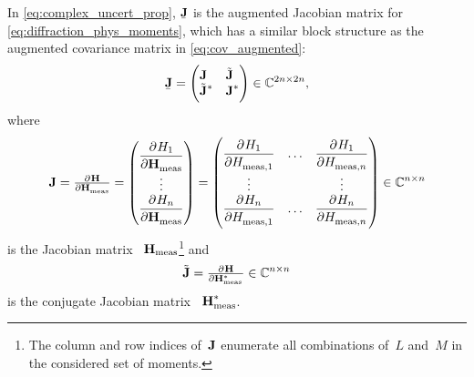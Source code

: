 In \cref{eq:complex_uncert_prop}, $\underaccent{\bar}{\mat{J}}$ is the
augmented Jacobian matrix for \cref{eq:diffraction_phys_moments}, which
has a similar block structure as the augmented covariance matrix in
\cref{eq:cov_augmented}:
\begin{equation}
  \label{eq:J_augmented}
  \underaccent{\bar}{\mat{J}}
  = \begin{pmatrix*}[l]
    \mat{J} & \tilde{\mat{J}} \\
    \tilde{\mat{J}}^* & \mat{J}^*
  \end{pmatrix*}
  \in \mathbb{C}^{2n \times 2n},
\end{equation}
where
\begin{equation}
  \mat{J}
  = \pd{\vect{H}}{\vect{H}_\text{meas}}
  = \begin{pmatrix}
    \dpd{H_1}{\vect{H}_\text{meas}} \\
    \vdots \\
    \dpd{H_n}{\vect{H}_\text{meas}}
  \end{pmatrix}
  = \begin{pmatrix}
    \dpd{H_1}{H_{\text{meas}, 1}} & \ldots & \dpd{H_1}{H_{\text{meas}, n}} \\
    \vdots & & \vdots \\
    \dpd{H_n}{H_{\text{meas}, 1}} & \ldots & \dpd{H_n}{H_{\text{meas}, n}}
  \end{pmatrix}
  \in \mathbb{C}^{n \times n}
\end{equation}
is the Jacobian matrix \wrt~$\bm{\mathrm{H}}_\text{meas}$\footnote{The column
and row indices of~$\bm{\mathrm{J}}$ enumerate all combinations of~$L$ and~$M$
in the considered set of moments.} and
\begin{equation}
  \tilde{\mat{J}}
  = \pd{\vect{H}}{{\vect{H}_\text{meas}^*}}
  \in \mathbb{C}^{n \times n}
\end{equation}
is the conjugate Jacobian matrix \wrt~$\bm{\mathrm{H}}_\text{meas}^*$.


